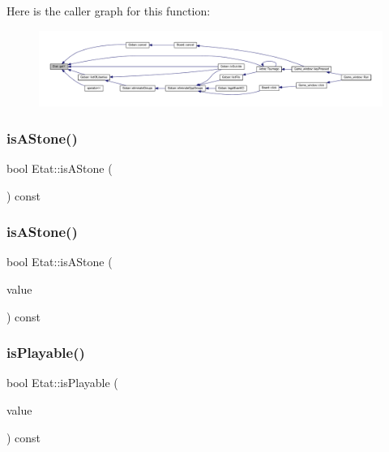 Here is the caller graph for this function\+:\nopagebreak
\begin{figure}[H]
\begin{center}
\leavevmode
\includegraphics[width=350pt]{class_etat_a3e3e915f2261c83989a983e84b1273c1_icgraph}
\end{center}
\end{figure}
\mbox{\label{class_etat_a98cc204acc13280c277e2aa6a32a54ec}} 
\subsubsection{\texorpdfstring{is\+A\+Stone()}{isAStone()}\hspace{0.1cm}{\footnotesize\ttfamily [1/2]}}
{\footnotesize\ttfamily bool Etat\+::is\+A\+Stone (\begin{DoxyParamCaption}{ }\end{DoxyParamCaption}) const}

\mbox{\label{class_etat_a64d8c0196e3e4de340726e2be29dec97}} 
\subsubsection{\texorpdfstring{is\+A\+Stone()}{isAStone()}\hspace{0.1cm}{\footnotesize\ttfamily [2/2]}}
{\footnotesize\ttfamily bool Etat\+::is\+A\+Stone (\begin{DoxyParamCaption}\item[{const \hyperlink{class_etat_af3ddb2296ffc379b7f3ad2bf832f294e}{V\+AL} \&}]{value }\end{DoxyParamCaption}) const}

\mbox{\label{class_etat_ac2fae5806a96974ce7717bc61a0ec0e9}} 
\subsubsection{\texorpdfstring{is\+Playable()}{isPlayable()}}
{\footnotesize\ttfamily bool Etat\+::is\+Playable (\begin{DoxyParamCaption}\item[{const \hyperlink{class_etat_af3ddb2296ffc379b7f3ad2bf832f294e}{V\+AL} \&}]{value }\end{DoxyParamCaption}) const}

